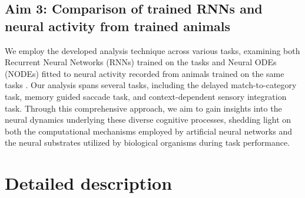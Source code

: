 \documentclass[12pt,letterpaper, onecolumn]{article}
\theoremstyle{definition}
\theoremstyle{remark}
\begin{document}
\subsection*{Aim 3: Comparison of trained RNNs and neural activity from trained animals}
We employ the developed analysis technique across various tasks, examining both Recurrent Neural Networks (RNNs) trained on the tasks and Neural ODEs (NODEs) fitted to neural activity recorded from animals trained on the same tasks \citep{zhao2016, pandarinath2018inferring}. Our analysis spans several tasks, including the delayed match-to-category task,
 memory guided saccade task,
  and context-dependent sensory integration task.
   Through this comprehensive approach, we aim to gain insights into the neural dynamics underlying these diverse cognitive processes, shedding light on both the computational mechanisms employed by artificial neural networks and the neural substrates utilized by biological organisms during task performance.


\newpage
\section{Detailed description}


\newpage
\printbibliography
\end{document}
